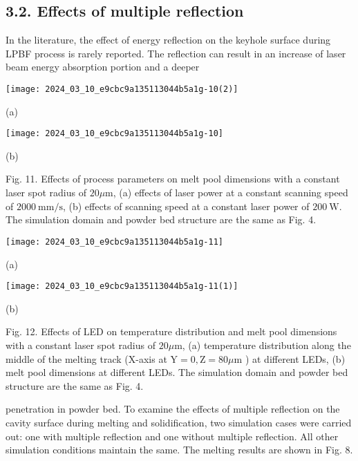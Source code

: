 \documentclass[10pt]{article}
\begin{document}
\subsection*{3.2. Effects of multiple reflection}
In the literature, the effect of energy reflection on the keyhole surface during LPBF process is rarely reported. The reflection can result in an increase of laser beam energy absorption portion and a deeper

\begin{center}
\texttt{[image: 2024\_03\_10\_e9cbc9a135113044b5a1g-10(2)]}
\end{center}

(a)

\begin{center}
\texttt{[image: 2024\_03\_10\_e9cbc9a135113044b5a1g-10]}
\end{center}

(b)

Fig. 11. Effects of process parameters on melt pool dimensions with a constant laser spot radius of $20 \mu \mathrm{m}$, (a) effects of laser power at a constant scanning speed of $2000 \mathrm{~mm} / \mathrm{s}$, (b) effects of scanning speed at a constant laser power of $200 \mathrm{~W}$. The simulation domain and powder bed structure are the same as Fig. 4.

\begin{center}
\texttt{[image: 2024\_03\_10\_e9cbc9a135113044b5a1g-11]}
\end{center}

(a)

\begin{center}
\texttt{[image: 2024\_03\_10\_e9cbc9a135113044b5a1g-11(1)]}
\end{center}

(b)

Fig. 12. Effects of LED on temperature distribution and melt pool dimensions with a constant laser spot radius of $20 \mu \mathrm{m}$, (a) temperature distribution along the middle of the melting track (X-axis at $\mathrm{Y}=0, \mathrm{Z}=80 \mu \mathrm{m}$ ) at different LEDs, (b) melt pool dimensions at different LEDs. The simulation domain and powder bed structure are the same as Fig. 4.

penetration in powder bed. To examine the effects of multiple reflection on the cavity surface during melting and solidification, two simulation cases were carried out: one with multiple reflection and one without multiple reflection. All other simulation conditions maintain the same. The melting results are shown in Fig. 8.
\end{document}
